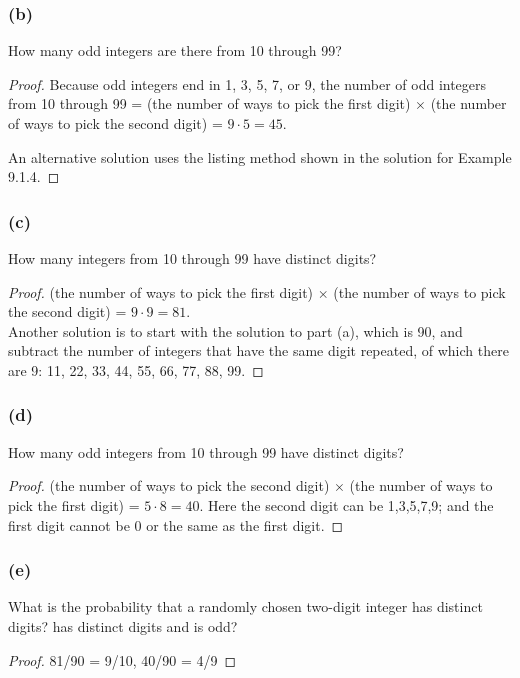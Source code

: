 \documentclass[14pt]{extarticle}
\begin{document}
\subsubsection{(b)}
How many odd integers are there from 10 through 99?

\begin{proof}
Because odd integers end in 1, 3, 5, 7, or 9, the number of odd integers from 10 through 99 = (the number of ways to 
pick the first digit) \(\times\) (the number of ways to pick the second digit) = \(9 \cdot 5 = 45\).

An alternative solution uses the listing method shown in the solution for Example 9.1.4.
\end{proof}

\subsubsection{(c)}
How many integers from 10 through 99 have distinct digits?

\begin{proof}
(the number of ways to pick the first digit) \(\times\) (the number of ways to pick the second digit) = 
\(9 \cdot 9 = 81\). \\
Another solution is to start with the solution to part (a), which is 90, and subtract the number of integers that have 
the same digit repeated, of which there are 9: 11, 22, 33, 44, 55, 66, 77, 88, 99.
\end{proof}

\subsubsection{(d)}
How many odd integers from 10 through 99 have distinct digits?

\begin{proof}
(the number of ways to pick the second digit) \(\times\) (the number of ways to pick the first digit) = \(5 \cdot 8 
= 40\). Here the second digit can be 1,3,5,7,9; and the first digit cannot be 0 or the same as the first digit.
\end{proof}

\subsubsection{(e)}
What is the probability that a randomly chosen two-digit integer has distinct digits? has distinct digits and is odd?

\begin{proof}
81/90 = 9/10, 40/90 = 4/9
\end{proof}
\end{document}
